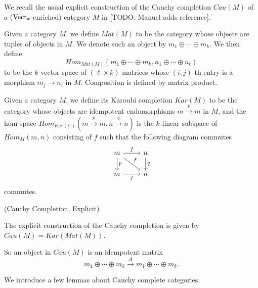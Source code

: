 \noindent We recall the usual explicit construction of the Cauchy completion $Cau(M)$ of a ($\operatorname{Vect}_k$-enriched) category $M$ in [TODO: Manuel adds reference].

\begin{definition}

Given a category $M$, we define $Mat(M)$ to be the category whose objects are tuples of objects in $M$. We denote such an object by $m_1\oplus\cdots\oplus m_k$. We then define $$Hom_{Mat(M)}(m_1\oplus\cdots\oplus m_k,n_1\oplus\cdots\oplus n_{\ell})$$ to be the $k$-vector space of $(\ell\times k)$ matrices whose $(i,j)$-th entry is a morphism $m_j\to n_i$ in $M$. Composition is defined by matrix product. \end{definition}

\begin{definition}
  Given a category $M$, we define its Karoubi completion $Kar(M)$ to be the category whose objects are idempotent endomorphisms $m \xrightarrow{p} m$ in $M$, and the hom space $Hom_{Kar(C)}(m \xrightarrow{p} m, n \xrightarrow{q} n)$ is the $k$-linear subspace of $Hom_{M}(m,n)$ consisting of $f$ such that the following diagram commutes
  \[\begin{tikzcd}
	m & n \\
	m & n
	\arrow["f", from=1-1, to=1-2]
	\arrow["p", from=1-1, to=2-1]
	\arrow["f", from=1-1, to=2-2]
	\arrow["q", from=1-2, to=2-2]
	\arrow["f"', from=2-1, to=2-2]
\end{tikzcd}\] commutes.\end{definition}

\begin{definition} \label{definition/cauchy-completion/explicit} (Cauchy Completion, Explicit)

  The explicit construction of the Cauchy completion is given by $Cau(M)=Kar(Mat(M))$. \end{definition}

\noindent So an object in $Cau(M)$ is an idempotent matrix $$m_1\oplus\cdots\oplus m_k \xrightarrow{A} m_1\oplus\cdots\oplus m_k.$$

\noindent We introduce a few lemmas about Cauchy complete categories.

